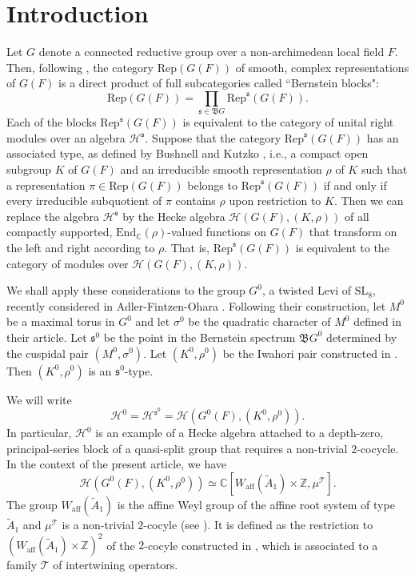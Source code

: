 \documentclass[11pt]{amsart}
\theoremstyle{remark}
\theoremstyle{definition}
\def\End{\mathrm{End}}
\newcommand{\Z}{\mathbb{Z}}
\newcommand{\C}{\mathbb{C}}
\newcommand{\cH}{\mathcal{H}}
\newcommand{\SL}{\mathrm{SL}}
\newcommand{\fs}{\mathfrak{s}}
\begin{document}
\tableofcontents

\section{Introduction}  

Let $G$  denote a connected reductive group over a non-archimedean local field $F$.  Then, following \cite{Ber}, the category $\mathrm{Rep}(G(F))$ of smooth, complex representations of $G(F)$ is a direct
product of full subcategories called ``Bernstein blocks":
\[
\mathrm{Rep}(G(F)) = \prod_{\fs \in \mathfrak{B}G} \mathrm{Rep}^\fs(G(F)).
\]
Each of the blocks $\mathrm{Rep}^\fs(G(F))$ is equivalent to the category of unital right modules
over an algebra $\cH^\fs$.   Suppose that the category $\mathrm{Rep}^\fs(G(F))$ has an associated type,
as defined by Bushnell and Kutzko \cite{BK}, i.e., a compact open subgroup $K$ of $G(F)$
and an irreducible smooth representation $\rho$ of $K$ such that a representation $\pi \in 
\mathrm{Rep}(G(F))$ belongs to $\mathrm{Rep}^\fs(G(F))$ if and only if every irreducible subquotient of $\pi$ 
contains $\rho$ upon restriction to $K$. Then we can replace the algebra $\cH^\fs$ by the Hecke
algebra $\cH(G(F),(K, \rho))$ of all compactly supported, $\End_{\C}(\rho)$-valued functions on
$G(F)$ that transform on the left and right according to $\rho$. That is, $\mathrm{Rep}^\fs(G(F))$ is
equivalent to the category of modules over $\cH(G(F),(K,\rho))$.

We shall apply these considerations to the  group $G^0$, a twisted Levi of $\SL_8$, recently considered in Adler-Fintzen-Ohara \cite{AFO}.   Following their construction, let $M^0$ be a maximal torus in $G^0$ and 
let $\sigma^0$ be the quadratic character  of $M^0$ defined in their article.   Let $\fs^0$ be the point in the Bernstein spectrum $\mathfrak{B}G^0$ determined by the cuspidal pair $(M^0, \sigma^0)$.
  Let $(K^0, \rho^0)$ be the Iwahori pair constructed in \cite{AFO}.   Then $(K^0, \rho^0)$ is an $\fs^0$-type.   

We will write
\[
\cH^0 = \cH^{\fs^0} = \mathcal{H}(G^0(F), (K^0, \rho^0)).
\]
In particular, $\cH^0$ is an example of
a Hecke algebra attached to a depth-zero, principal-series block of a quasi-split
group that requires a non-trivial $2$-cocycle.   In the context of the present article, we have
\[
\boxed{
\mathcal{H}(G^0(F), (K^0, \rho^0)) \simeq  \C[W_{\mathrm{aff}}(\widetilde{A}_1) \times \Z, \mu^\mathcal{T}].
}
\]
The group $W_{\mathrm{aff}}(\widetilde{A}_1)$ is the affine Weyl group of the affine root system of type $\widetilde{A}_1$ and  $\mu^\mathcal{T}$ is a non-trivial $2$-cocyle (see \cite[Corollary~3.9]{AFO}). It is defined as the restriction to $(W_{\mathrm{aff}}(\widetilde{A}_1) \times \Z)^2$  of the $2$-cocyle constructed in \cite[Notation~3.6.1]{AFMO1}, which is associated to a family $\mathcal{T}$ of intertwining operators.
\end{document}
